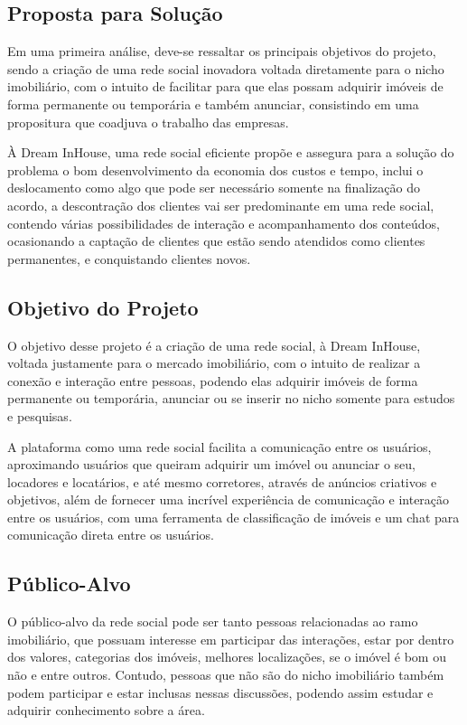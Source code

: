 \documentclass[../main.tex]{subfiles}
\begin{document}
\subsection{Proposta para Solução}
Em uma primeira análise, deve-se ressaltar os principais objetivos do projeto, sendo a criação de uma rede social inovadora voltada diretamente para o nicho imobiliário, com o intuito de facilitar para que elas possam adquirir imóveis de forma permanente ou temporária e também anunciar, consistindo em uma propositura que coadjuva o trabalho das empresas. 

À Dream InHouse, uma rede social eficiente propõe e assegura para a solução do problema o bom desenvolvimento da economia dos custos e tempo, inclui o deslocamento como algo que pode ser necessário somente na finalização do acordo, a descontração dos clientes vai ser predominante em uma rede social, contendo várias possibilidades de interação e acompanhamento dos conteúdos, ocasionando a captação de clientes que estão sendo atendidos como clientes permanentes, e conquistando clientes novos. 
\subsection{Objetivo do Projeto}
O objetivo desse projeto é a criação de uma rede social, à Dream InHouse, voltada justamente para o mercado imobiliário, com o intuito de realizar a conexão e interação entre pessoas, podendo elas adquirir imóveis de forma permanente ou temporária, anunciar ou se inserir no nicho somente para estudos e pesquisas.  

A plataforma como uma rede social facilita a comunicação entre os usuários, aproximando usuários que queiram adquirir um imóvel ou anunciar o seu, locadores e locatários, e até mesmo corretores, através de anúncios criativos e objetivos, além de fornecer uma incrível experiência de comunicação e interação entre os usuários, com uma ferramenta de classificação de imóveis e um chat para comunicação direta entre os usuários. 
\subsection{Público-Alvo}
O público-alvo da rede social pode ser tanto pessoas relacionadas ao ramo imobiliário, que possuam interesse em participar das interações, estar por dentro dos valores, categorias dos imóveis, melhores localizações, se o imóvel é bom ou não e entre outros. Contudo, pessoas que não são do nicho imobiliário também podem participar e estar inclusas nessas discussões, podendo assim estudar e adquirir conhecimento sobre a área.
\end{document}
